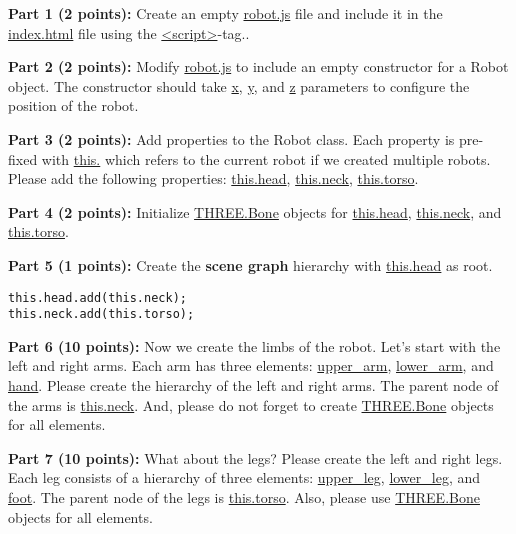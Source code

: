 \documentclass[10pt,oneside,onecolumn,letterpaper]{article}
\begin{document}
\vspace{.5cm}


\noindent\textbf{Part 1 (2 points):} Create an empty \url{robot.js} file and include it in the \url{index.html} file using the \url{<script>}-tag..

\vspace{.5cm}

\noindent\textbf{Part 2 (2 points):} Modify \url{robot.js} to include an empty constructor for a Robot object. The constructor should take \url{x}, \url{y}, and \url{z} parameters to configure the position of the robot.

\vspace{.5cm}

\noindent\textbf{Part 3 (2 points):} Add properties to the Robot class. Each property is pre-fixed with \url{this.} which refers to the current robot if we created multiple robots. Please add the following properties: \url{this.head}, \url{this.neck}, \url{this.torso}.

\vspace{.5cm}

\noindent\textbf{Part 4 (2 points):} Initialize \url{THREE.Bone} objects for \url{this.head}, \url{this.neck}, and \url{this.torso}.

\clearpage

\noindent\textbf{Part 5 (1 points):} Create the \textbf{scene graph} hierarchy with \url{this.head} as root.

\vspace{.5cm}

\begin{verbatim}
this.head.add(this.neck);
this.neck.add(this.torso);
\end{verbatim}

\vspace{.5cm}

\noindent\textbf{Part 6 (10 points):} Now we create the limbs of the robot. Let's start with the left and right arms. Each arm has three elements: \url{upper_arm}, \url{lower_arm}, and \url{hand}. Please create the hierarchy of the left and right arms. The parent node of the arms is \url{this.neck}. And, please do not forget to create \url{THREE.Bone} objects for all elements.

\vspace{.5cm}

\noindent\textbf{Part 7 (10 points):} What about the legs? Please create the left and right legs. Each leg consists of a hierarchy of three elements: \url{upper_leg}, \url{lower_leg}, and \url{foot}. The parent node of the legs is \url{this.torso}. Also, please use \url{THREE.Bone} objects for all elements.
\end{document}
